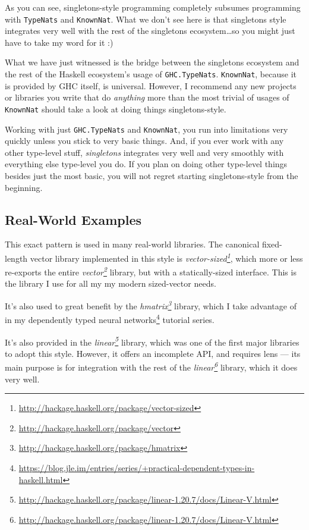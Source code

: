 \documentclass[]{article}
\renewcommand{\href}[2]{#2\footnote{\url{#1}}}
\begin{document}
As you can see, singletons-style programming completely subsumes programming
with \texttt{TypeNats} and \texttt{KnownNat}. What we don't see here is that
singletons style integrates very well with the rest of the singletons
ecosystem\ldots so you might just have to take my word for it :)

What we have just witnessed is the bridge between the singletons ecosystem and
the rest of the Haskell ecosystem's usage of \texttt{GHC.TypeNats}.
\texttt{KnownNat}, because it is provided by GHC itself, is universal. However,
I recommend any new projects or libraries you write that do \emph{anything} more
than the most trivial of usages of \texttt{KnownNat} should take a look at doing
things singletons-style.

Working with just \texttt{GHC.TypeNats} and \texttt{KnownNat}, you run into
limitations very quickly unless you stick to very basic things. And, if you ever
work with any other type-level stuff, \emph{singletons} integrates very well and
very smoothly with everything else type-level you do. If you plan on doing other
type-level things besides just the most basic, you will not regret starting
singletons-style from the beginning.

\hypertarget{real-world-examples}{%
\subsection{Real-World Examples}\label{real-world-examples}}

This exact pattern is used in many real-world libraries. The canonical
fixed-length vector library implemented in this style is
\emph{\href{http://hackage.haskell.org/package/vector-sized}{vector-sized}},
which more or less re-exports the entire
\emph{\href{http://hackage.haskell.org/package/vector}{vector}} library, but
with a statically-sized interface. This is the library I use for all my my
modern sized-vector needs.

It's also used to great benefit by the
\emph{\href{http://hackage.haskell.org/package/hmatrix}{hmatrix}} library, which
I take advantage of in my
\href{https://blog.jle.im/entries/series/+practical-dependent-types-in-haskell.html}{dependently
typed neural networks} tutorial series.

It's also provided in the
\emph{\href{http://hackage.haskell.org/package/linear-1.20.7/docs/Linear-V.html}{linear}}
library, which was one of the first major libraries to adopt this style.
However, it offers an incomplete API, and requires lens --- its main purpose is
for integration with the rest of the
\emph{\href{http://hackage.haskell.org/package/linear-1.20.7/docs/Linear-V.html}{linear}}
library, which it does very well.
\end{document}

